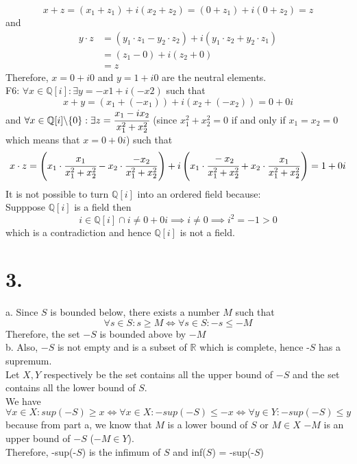 \documentclass[11pt]{article}
\begin{document}
\[
x + z = (x_1 + z_1) + i(x_2 + z_2) = (0+z_1)+i(0+z_2) = z 
\]
and 
\begin{equation*}
\begin{aligned}
y \cdot z 
&= (y_1 \cdot z_1 - y_2 \cdot z_2) + i(y_1 \cdot z_2 + y_2 \cdot z_1) \\
&= (z_1 - 0) + i(z_2 + 0) \\
&= z
\end{aligned}
\end{equation*}
Therefore, $x=0+i0$ and $y=1+i0$ are the neutral elements. \\
F6: $\forall x \in \mathbb{Q}[i]: \exists y=-x1+i(-x2)$ such that 
\[
x + y = (x_1 + (-x_1)) + i(x_2 + (-x_2)) = 0 + 0i
\]
and $\forall x \in \mathbb{Q}[i] \backslash \{0\}: \exists z= \cfrac{x_1 - ix_2}{x_1^2+x_2^2}$ (since $x_1^2+x_2^2=0$ if and only if $x_1 = x_2 = 0$ which means that $x = 0+0i$) such that 
\[
x \cdot z = \left(x_1 \cdot \cfrac{x_1}{x_1^2 + x_2^2} - x_2 \cdot \frac{-x_2}{x_1^2 + x_2^2} \right) + i\left( x_1 \cdot \cfrac{-x_2}{x_1^2 + x_2^2} + x_2 \cdot \frac{x_1}{x_1^2 + x_2^2}\right) = 1+0i
\]
It is not possible to turn $\mathbb{Q}[i]$ into an ordered field because: \\
Supppose $\mathbb{Q}[i]$ is a field then
\[
i \in \mathbb{Q}[i] \cap i \ne 0+0i \implies i \ne 0 \implies i^2=-1>0 
\]
which is a contradiction and hence $\mathbb{Q}[i]$ is not a field.







\pagebreak
\section*{3.}
a.
Since $S$ is bounded below, there exists a number $M$ such that \\
\[\forall s \in S: s \ge M  \iff \forall s \in S: -s \le -M\]
Therefore, the set $-S$ is bounded above by $-M$ \\	
b.
Also, $-S$ is not empty and is a subset of $\mathbb{R}$ which is complete, hence -$S$ has a supremum. \\
Let $X, Y$ respectively be the set contains all the upper bound of $-S$ and the set contains all the lower bound of $S$. \\
We have 
\[\forall x \in X: sup(-S) \ge x \iff \forall x \in X: -sup(-S) \le -x \iff \forall y \in Y: -sup(-S) \le y\]
because from part a, we know that $M$ is a lower bound of $S$ or $M \in X$  $-M$ is an upper bound of $-S$ ($-M \in Y$).\\
Therefore, -sup(-$S$) is the infimum of $S$ and inf($S$) = -sup(-$S$)
\end{document}
